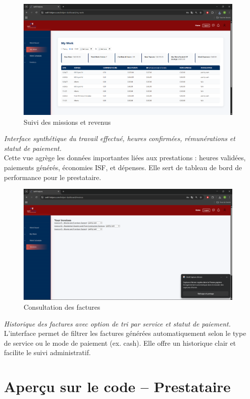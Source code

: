 \begin{figure}[H]
\centering
\includegraphics[width=0.85\linewidth]{figures/work.png}
\caption{Suivi des missions et revenus}
\end{figure}
\textit{Interface synthétique du travail effectué, heures confirmées, rémunérations et statut de paiement.}\\
Cette vue agrège les données importantes liées aux prestations : heures validées, paiements générés, économies ISF, et dépenses. Elle sert de tableau de bord de performance pour le prestataire.

\begin{figure}[H]
\centering
\includegraphics[width=0.85\linewidth]{figures/invoices.png}
\caption{Consultation des factures}
\end{figure}
\textit{Historique des factures avec option de tri par service et statut de paiement.}\\
L’interface permet de filtrer les factures générées automatiquement selon le type de service ou le mode de paiement (ex. cash). Elle offre un historique clair et facilite le suivi administratif.
\section*{Aperçu sur le code – Prestataire}

